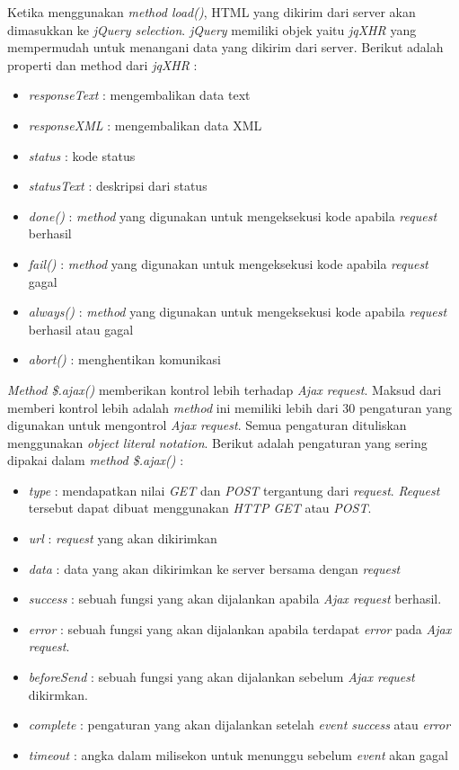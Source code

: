 Ketika menggunakan \textit{method load()}, HTML yang dikirim dari server akan dimasukkan ke \textit{jQuery selection}. \textit{jQuery} memiliki objek yaitu \textit{jqXHR} yang mempermudah untuk menangani data yang dikirim dari server. Berikut adalah properti dan method dari \textit{jqXHR} :

\begin{itemize}
	\item \textit{responseText} : mengembalikan data text
	\item \textit{responseXML} : mengembalikan data XML
	\item \textit{status} : kode status
	\item \textit{statusText} : deskripsi dari status
	\item \textit{done()} : \textit{method} yang digunakan untuk mengeksekusi kode apabila \textit{request} berhasil
	\item \textit{fail()} : \textit{method} yang digunakan untuk mengeksekusi kode apabila \textit{request} gagal
	\item \textit{always()} : \textit{method} yang digunakan untuk mengeksekusi kode apabila \textit{request} berhasil atau gagal
	\item \textit{abort()} : menghentikan komunikasi
\end{itemize} 

\textit{Method \$.ajax()} memberikan kontrol lebih terhadap \textit{Ajax request}. Maksud dari memberi kontrol lebih adalah \textit{method} ini memiliki lebih dari 30 pengaturan yang digunakan untuk mengontrol \textit{Ajax request}. Semua pengaturan dituliskan menggunakan \textit{object literal notation}. Berikut adalah pengaturan yang sering dipakai dalam \textit{method \$.ajax()} :

\begin{itemize}
	\item \textit{type} : mendapatkan nilai \textit{GET} dan \textit{POST} tergantung dari \textit{request}. \textit{Request} tersebut dapat dibuat menggunakan \textit{HTTP GET} atau \textit{POST}.
	\item \textit{url} : \textit{request} yang akan dikirimkan
	\item \textit{data} : data yang akan dikirimkan ke server bersama dengan \textit{request}
	\item \textit{success} : sebuah fungsi yang akan dijalankan apabila \textit{Ajax request} berhasil. 
	\item \textit{error} : sebuah fungsi yang akan dijalankan apabila terdapat \textit{error} pada \textit{Ajax request}. 
	\item \textit{beforeSend} : sebuah fungsi yang akan dijalankan sebelum \textit{Ajax request} dikirmkan.
	\item \textit{complete} : pengaturan yang akan dijalankan setelah \textit{event success} atau \textit{error}
	\item \textit{timeout} : angka dalam milisekon untuk menunggu sebelum \textit{event} akan gagal
\end{itemize}

